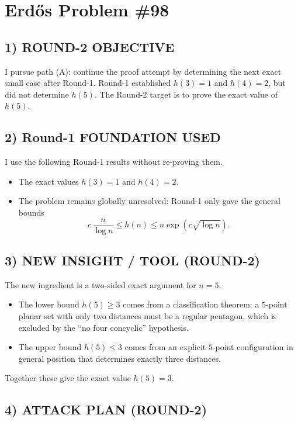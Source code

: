 \section{Erd\H{o}s Problem \#98}

\subsection*{1) ROUND-2 OBJECTIVE}

I pursue path (A): continue the proof attempt by determining the next exact small case after Round-1. Round-1 established $h(3)=1$ and $h(4)=2$, but did not determine $h(5)$. The Round-2 target is to prove the exact value of $h(5)$.

\subsection*{2) Round-1 FOUNDATION USED}

I use the following Round-1 results without re-proving them.

\begin{itemize}
\item The exact values $h(3)=1$ and $h(4)=2$.
\item The problem remains globally unresolved: Round-1 only gave the general bounds
\[
c\,\frac{n}{\log n}\le h(n)\le n\exp(c\sqrt{\log n}).
\]
\end{itemize}

\subsection*{3) NEW INSIGHT / TOOL (ROUND-2)}

The new ingredient is a two-sided exact argument for $n=5$.

\begin{itemize}
\item The lower bound $h(5)\ge 3$ comes from a classification theorem: a $5$-point planar set with only two distances must be a regular pentagon, which is excluded by the ``no four concyclic'' hypothesis.
\item The upper bound $h(5)\le 3$ comes from an explicit $5$-point configuration in general position that determines exactly three distances.
\end{itemize}

Together these give the exact value $h(5)=3$.

\subsection*{4) ATTACK PLAN (ROUND-2)}

